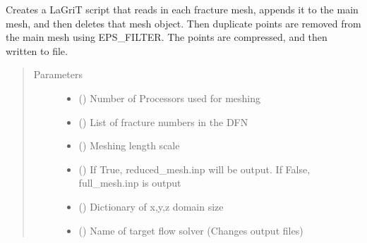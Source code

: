 \documentclass[letterpaper,10pt,english]{sphinxmanual}
\begin{document}

\begin{fulllineitems}
\label{\detokenize{pydfnworks:pydfnworks.dfnGen.lagrit_scripts.create_merge_poly_files}}
Creates a LaGriT script that reads in each fracture mesh, appends it to the main mesh, and then deletes that mesh object. Then duplicate points are removed from the main mesh using EPS\_FILTER.  The points are compressed, and then written to file.
\begin{quote}\begin{description}
\item[{Parameters}] \leavevmode\begin{itemize}
\item {} 
 () \textendash{} Number of Processors used for meshing

\item {} 
 () \textendash{} List of fracture numbers in the DFN

\item {} 
 () \textendash{} Meshing length scale

\item {} 
 () \textendash{} If True, reduced\_mesh.inp will be output. If False, full\_mesh.inp is output

\item {} 
 () \textendash{} Dictionary of x,y,z domain size

\item {} 
 () \textendash{} Name of target flow solver (Changes output files)


\end{itemize}
\end{description}
\end{quote}
\end{fulllineitems}
\end{document}
